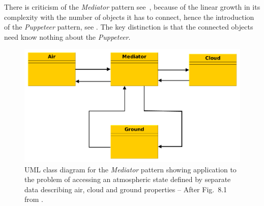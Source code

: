 There is criticism of the {\it Mediator} pattern see~, because
of the linear growth in its complexity with the number of objects it has to connect, hence
the introduction of the {\it Puppeteer} pattern, see . The key distinction is that the connected
objects need know nothing about the {\it Puppeteer}.
\begin{figure}
\centerline{\includegraphics[width=12cm]{../png/mediator2_wa}}
\caption{UML class diagram for the {\it Mediator} pattern showing application to the problem of
accessing an atmospheric state defined by separate data describing air, cloud and ground properties -- After
Fig.~8.1 from .\label{fig:mediator}}
\end{figure}
